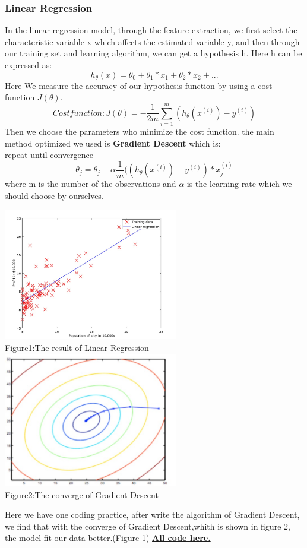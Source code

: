 \documentclass[a4paper]{article}
\begin{document}
{\subsubsection{\textbf{Linear Regression}}
In the linear regression model, through the feature extraction, we  first select the characteristic variable x which affects the estimated variable y, and then through our training set and learning algorithm, we can get a hypothesis h. Here h can be expressed as:$$h_\theta(x)=\theta_0+\theta_1*x_1+\theta_2*x_2+...$$
Here We measure the accuracy of our hypothesis function by using a cost function $J(\theta)$.$$Cost function: J(\theta)=-\frac{1}{2m}\sum_{i=1}^{m}(h_\theta(x^{(i)})-y^{(i)})$$ Then we choose the parameters who minimize the cost function. the main method optimized we used is \textbf{Gradient Descent} which is:\\repeat until convergence$$\theta_j=\theta_j-\alpha\frac{1}{m}((h_\theta(x^{(i)})-y^{(i)})*x_j^{(i)}$$where m is the number of the observations and $\alpha$ is the learning rate which we should choose by ourselves. \\
\begin{center}
\includegraphics[width=3in]{linear.png}\\
Figure1:The result of Linear Regression
\includegraphics[width=3in]{grad.png}\\
Figure2:The converge of Gradient Descent
\end{center}
Here we have one coding practice, after write the algorithm of Gradient Descent, we find that with the converge of Gradient Descent,whith is shown in figure 2, the model fit our data better.(Figure 1)
\textbf{\href{https://github.com/GuangYueCHEN/ENSIIE/tree/master/Plus/MachineLearning/machine-learning-ex1}{All code here.} }\\
}
\end{document}
